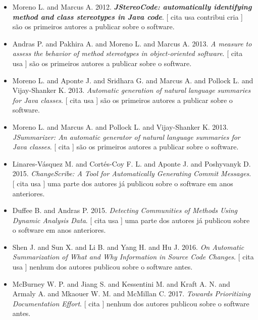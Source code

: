 \begin{itemize}
\item Moreno L. and Marcus A.
      2012.
        \textbf{\textit{ JStereoCode: automatically identifying method and class stereotypes in Java code}}.
      [
          cita
          usa
          contribui
          cria
      ]
são os primeiros autores a publicar sobre o software.
\item Andras P. and Pakhira A. and Moreno L. and Marcus A.
      2013.
        \textit{ A measure to assess the behavior of method stereotypes in object-oriented software}.
      [
          cita
          usa
      ]
são os primeiros autores a publicar sobre o software.
\item Moreno L. and Aponte J. and Sridhara G. and Marcus A. and Pollock L. and Vijay-Shanker K.
      2013.
        \textit{ Automatic generation of natural language summaries for Java classes}.
      [
          cita
          usa
      ]
são os primeiros autores a publicar sobre o software.
\item Moreno L. and Marcus A. and Pollock L. and Vijay-Shanker K.
      2013.
        \textit{ JSummarizer: An automatic generator of natural language summaries for Java classes}.
      [
          cita
      ]
são os primeiros autores a publicar sobre o software.
\item Linares-V\'{a}squez M. and Cort{\'e}s-Coy F. L. and Aponte J. and Poshyvanyk D.
      2015.
        \textit{ ChangeScribe: A Tool for Automatically Generating Commit Messages}.
      [
          cita
          usa
      ]
uma parte dos autores já publicou sobre o software em anos anteriores.
\item Duffee B. and Andras P.
      2015.
        \textit{ Detecting Communities of Methods Using Dynamic Analysis Data}.
      [
          cita
          usa
      ]
uma parte dos autores já publicou sobre o software em anos anteriores.
\item Shen J. and Sun X. and Li B. and Yang H. and Hu J.
      2016.
        \textit{ On Automatic Summarization of What and Why Information in Source Code Changes}.
      [
          cita
          usa
      ]
nenhum dos autores publicou sobre o software antes.
\item McBurney W. P. and Jiang S. and Kessentini M. and Kraft A. N. and Armaly A. and Mkaouer W. M. and McMillan C.
      2017.
        \textit{ Towards Prioritizing Documentation Effort}.
      [
          cita
      ]
nenhum dos autores publicou sobre o software antes.
\end{itemize}
